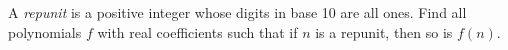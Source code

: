 A \emph{repunit} is a positive integer whose digits in base 10 are
all ones. Find all polynomials $f$ with real coefficients such that if
$n$ is a repunit, then so is $f(n)$.
